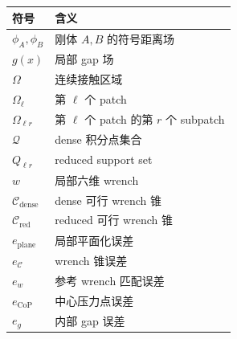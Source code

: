 \begin{longtable}{p{}p{}}
\toprule
符号 & 含义 \\
\midrule
$\phi_A,\phi_B$ & 刚体 $A,B$ 的符号距离场 \\
$g(x)$ & 局部 gap 场 \\
$\Omega$ & 连续接触区域 \\
$\Omega_\ell$ & 第 $\ell$ 个 patch \\
$\Omega_{\ell r}$ & 第 $\ell$ 个 patch 的第 $r$ 个 subpatch \\
$\mathcal{Q}$ & dense 积分点集合 \\
$Q_{\ell r}$ & reduced support set \\
$w$ & 局部六维 wrench \\
$\mathcal{C}_{\mathrm{dense}}$ & dense 可行 wrench 锥 \\
$\mathcal{C}_{\mathrm{red}}$ & reduced 可行 wrench 锥 \\
$e_{\mathrm{plane}}$ & 局部平面化误差 \\
$e_{\mathcal{C}}$ & wrench 锥误差 \\
$e_w$ & 参考 wrench 匹配误差 \\
$e_{\mathrm{CoP}}$ & 中心压力点误差 \\
$e_g$ & 内部 gap 误差 \\
\bottomrule
\end{longtable}
